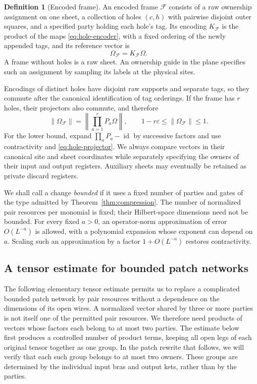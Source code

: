 \documentclass[11pt]{article}
\numberwithin{equation}{section}
\theoremstyle{definition}
\newtheorem{definition}[theorem]{Definition}
\theoremstyle{remark}
\DeclareMathOperator{\id}{id}
\newcommand{\norm}[1]{\lVert #1\rVert}
\begin{document}
\begin{definition}[Encoded frame]\label{def:frame}
An encoded frame $\mathcal F$ consists of a raw ownership assignment on one
sheet, a collection of holes $(c,h)$ with pairwise disjoint outer squares,
and a specified party holding each hole's tag.  Its encoding $K_{\mathcal F}$
is the product of the maps \eqref{eq:hole-encoder}, with a fixed ordering of
the newly appended tags, and its reference vector is
\begin{equation}\label{eq:frame-vector}
  \Omega_{\mathcal F}=K_{\mathcal F}\Omega.
\end{equation}
A frame without holes is a raw sheet.  An ownership guide in the plane
specifies such an assignment by sampling its labels at the physical sites.
\end{definition}

Encodings of distinct holes have disjoint raw supports and separate tags,
so they commute after the canonical identification of tag orderings.
If the frame has $r$ holes, their projectors also commute, and therefore
\begin{equation}\label{eq:frame-norm}
 \norm{\Omega_{\mathcal F}}
   =\left\|\prod_{a=1}^{r}P_a\Omega\right\|,
 \qquad
 1-r\varepsilon\le\norm{\Omega_{\mathcal F}}\le1.
\end{equation}
For the lower bound, expand $\prod_aP_a-\id$ by successive factors and use
contractivity and \eqref{eq:hole-projector}.  We always compare vectors in
their canonical site and sheet coordinates while separately specifying the
owners of their input and output registers.  Auxiliary sheets may eventually
be retained as private discard registers.

We shall call a change \emph{bounded} if it uses a fixed number of parties
and gates of the type admitted by Theorem~\ref{thm:compression}.  The number
of normalized pair resources per monomial is fixed; their Hilbert-space
dimensions need not be bounded.  For every fixed $a>0$, an operator-norm
approximation of error $O(L^{-a})$ is allowed, with a polynomial expansion
whose exponent can depend on $a$.  Scaling such an approximation by a
factor $1+O(L^{-a})$ restores contractivity.

\subsection{A tensor estimate for bounded patch networks}

The following elementary tensor estimate permits us to replace a complicated
bounded patch network by pair resources without a dependence on the
dimensions of its open wires.  A normalized vector shared by three or more
parties is not itself one of the permitted pair resources.  We therefore
need products of vectors whose factors each belong to at most two parties.
The estimate below first produces a controlled number of product terms,
keeping all open legs of each original tensor together as one group.
In the patch rewrite that follows, we will verify that each such group
belongs to at most two owners.  These groups are determined by the
individual input bras and output kets, rather than by the parties.
\end{document}
